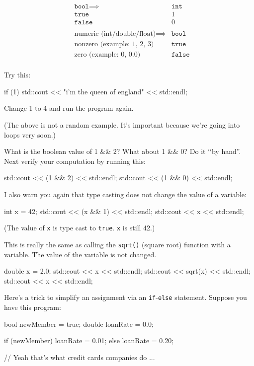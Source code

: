 \begin{align*}
&\texttt{bool} \implies &\texttt{int}\\
&\texttt{true} &1\\
&\texttt{false} &0\\\\
&\text{numeric (int/double/float)} \implies &\texttt{bool}\\
&\text{nonzero (example: 1, 2, 3)} &\texttt{true}\\
&\text{zero (example: 0, 0.0)} &\texttt{false}\\
\end{align*}

Try this:\\
\begin{console}
if (1)
std::cout << "i'm the queen of england"
          << std::endl; 
\end{console}

Change 1 to 4 and run the program again.

(The above is not a random example. It's important
because we're going into loops very soon.)

\begin{ex}
What is the boolean value of 1 \&\& 2? What about 1 \&\& 0? Do it \lq\lq by hand''. Next verify your computation by running this:\\
\begin{console}
std::cout << (1 \&\& 2) << std::endl;
std::cout << (1 \&\& 0) << std::endl; 
\end{console}
\end{ex}

I also warn you again that type casting does not change the value of a
variable:\\
\begin{console}
int x = 42;
std::cout << (x && 1) << std::endl;
std::cout << x << std::endl; 
\end{console}

(The value of \texttt{x} is type cast to \texttt{true}. \texttt{x} is still 42.)

This is really the same as calling the \texttt{sqrt()} (square root) function with a variable. The value of the variable is not changed.
\begin{console}
double x = 2.0;
std::cout << x << std::endl;
std::cout << sqrt(x) << std::endl;
std::cout << x << std::endl; 
\end{console}
\newpage{}

Here's a trick to simplify an assignment via an
\texttt{if}-\texttt{else} statement. Suppose you have this program:\\
\begin{console}
bool newMember = true;
double loanRate = 0.0;

if (newMember)
   loanRate = 0.01;
else
   loanRate = 0.20;

// Yeah that's what credit cards companies do ... 
\end{console}

